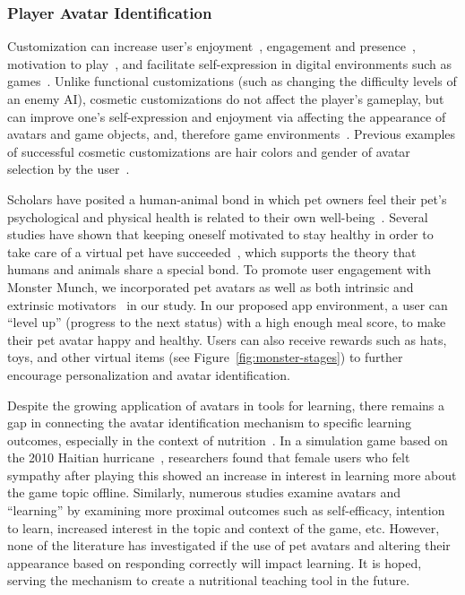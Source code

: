 \vspace{-5pt}
\subsubsection{Player Avatar Identification}
Customization can increase user's enjoyment~\cite{birk2016fostering,marathe2011drives,trepte2010avatar,turkay2015effects}, engagement and presence~\cite{ng2013examining}, motivation to play~\cite{turkay2015effects}, and facilitate self-expression in digital environments such as games~\cite{adinolf2011controlling,bailey2009avatar}. Unlike functional customizations (such as changing the difficulty levels of an enemy AI), cosmetic customizations do not affect the player's gameplay, but can improve one's self-expression and enjoyment via affecting the appearance of avatars and game objects, and, therefore game environments~\cite{cuthbert2019effects}. Previous examples of successful cosmetic customizations are hair colors and gender of avatar selection by the user~\cite{turkay2014effects}. 

Scholars have posited a human-animal bond in which pet owners feel their pet's psychological and physical health is related to their own well-being~\cite{chesney2007illusion,cohen2001defining,hosey2014human,lin2017exploring,zichermann2011gamification}. Several studies have shown that keeping oneself motivated to stay healthy in order to take care of a virtual pet have succeeded~\cite{ahn2015using,byrne2012caring,lin2006fish,pollak2010s}, which supports the theory that humans and animals share a special bond. To promote user engagement with Monster Munch, we incorporated pet avatars as well as both intrinsic and extrinsic motivators~\cite{chen2016scaffolding,habgood2011motivating} in our study. In our proposed app environment, a user can ``level up'' (progress to the next status) with a high enough meal score, to make their pet avatar happy and healthy. Users can also receive rewards such as hats, toys, and other virtual items (see Figure~\ref{fig:monster-stages}) to further encourage personalization and avatar identification.


Despite the growing application of avatars in tools for learning, there remains a gap in connecting the avatar identification mechanism to specific learning outcomes, especially in the context of nutrition~\cite{chang2019stereotype,chen2019effects,de2019algebright,lin2019evaluating}. In a simulation game based on the 2010 Haitian hurricane~\cite{bachen2016presence}, researchers found that female users who felt sympathy after playing this showed an increase in interest in learning more about the game topic offline. Similarly, numerous studies examine avatars and ``learning'' by examining more proximal outcomes such as self-efficacy, intention to learn, increased interest in the topic and context of the game, etc. However, none of the literature has investigated if the use of pet avatars and altering their appearance based on responding correctly will impact learning. It is hoped, serving the mechanism to create a nutritional teaching tool in the future. 




